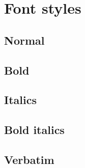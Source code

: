 \documentclass[9pt, twoside]{extreport}
\begin{document}
\chapter{Font styles}

\section{Normal}

\lipsum[13-14]

\section{Bold}

\textbf{\lipsum[15-16]}

\section{Italics}

\textit{\lipsum[17-18]}

\section{Bold italics}

\textit{\textbf{\lipsum[19]}}

\textbf{\textit{\lipsum[20]}}

\section{Verbatim}

\texttt{\lipsum[21-22]}
\end{document}
